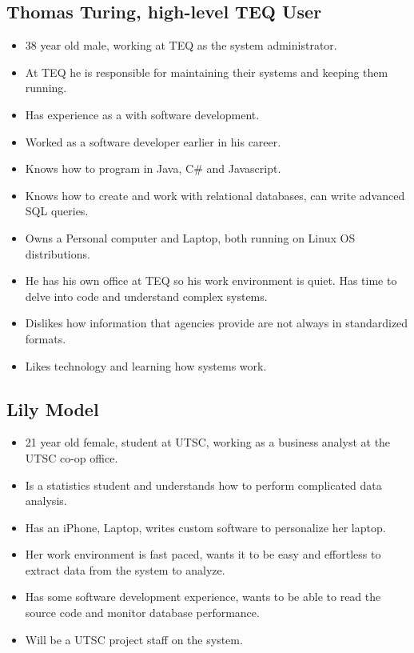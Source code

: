 \documentclass[12pt]{article}
\begin{document}
  \subsection{Thomas Turing, high-level TEQ User}
\begin{itemize}%
\item 38 year old male, working at TEQ as the system administrator.
\item At TEQ he is responsible for maintaining their systems and keeping them running.
\item Has experience as a with software development.
\item Worked as a software developer earlier in his career.
\item Knows how to program in Java, C\# and Javascript. 
\item Knows how to create and work with relational databases, can write advanced SQL queries.
\item Owns a Personal computer and Laptop, both running on Linux OS distributions.
\item He has his own office at TEQ so his work environment is quiet. Has time to delve into code and understand complex systems.
\item Dislikes how information that agencies provide are not always in standardized formats.
\item Likes technology and learning how systems work.

 \end{itemize}
 
 \subsection{Lily Model}
\begin{itemize}%
\item 21 year old female, student at UTSC, working as a business analyst at the UTSC co-op office.
\item Is a statistics student and understands how to perform complicated data analysis.
\item Has an iPhone, Laptop, writes custom software to personalize her laptop.
\item Her work environment is fast paced, wants it to be easy and effortless to extract data from the system to analyze. 
\item Has some software development experience, wants to be able to read the source code and monitor database performance.
\item Will be a UTSC project staff on the system.
 \end{itemize}
\end{document}
